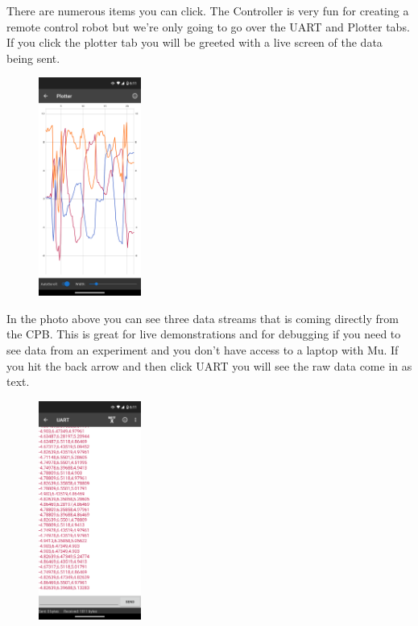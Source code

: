 There are numerous items you can click. The Controller is very fun for
creating a remote control robot but we're only going to go over the
UART and Plotter tabs. If you click the plotter tab you will be
greeted with a live screen of the data being sent. 
\begin{figure}[H]
  \begin{center}
    \includegraphics[width=0.3\textwidth]{Figures/phoneapp3.png}
  \end{center}
\end{figure}
In the photo above you can see three data streams that is coming
directly from the CPB. This is great for live demonstrations and for
debugging if you need to see data from an experiment and you don't
have access to a laptop with Mu. If you hit the back arrow and then
click UART you will see the raw data come in as text. 
\begin{figure}[H]
  \begin{center}
    \includegraphics[width=0.3\textwidth]{Figures/phoneapp4.png}
  \end{center}
\end{figure}
